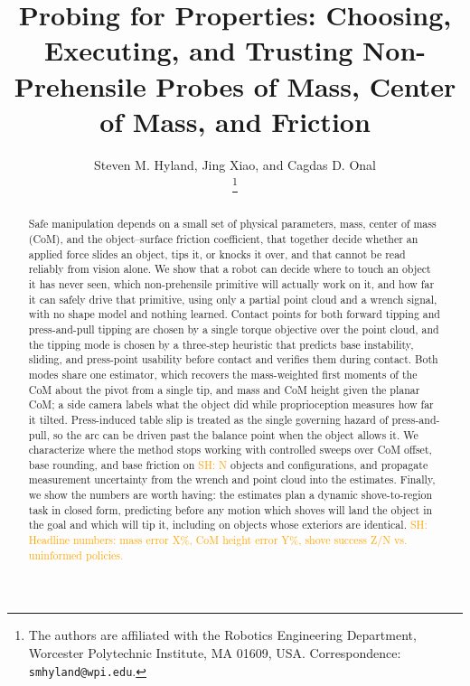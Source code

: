 \documentclass[10pt, conference]{IEEEtran}
\title{\LARGE \bf Probing for Properties: Choosing, Executing, and Trusting Non-Prehensile Probes of Mass, Center of Mass, and Friction}
\newcommand{\sh}[1]{\textcolor{orange}{SH: #1}}
\begin{document}
\author{Steven M. Hyland, Jing Xiao, and Cagdas D. Onal \\ \thanks{The authors are affiliated with the Robotics Engineering Department, Worcester Polytechnic Institute, MA 01609, USA. Correspondence: \texttt{smhyland@wpi.edu}.}}

\maketitle
\pagestyle{plain}
\thispagestyle{plain}

\begin{abstract}
Safe manipulation depends on a small set of physical parameters, mass, center of mass (CoM), and the object--surface friction coefficient, that together decide whether an applied force slides an object, tips it, or knocks it over, and that cannot be read reliably from vision alone. We show that a robot can decide where to touch an object it has never seen, which non-prehensile primitive will actually work on it, and how far it can safely drive that primitive, using only a partial point cloud and a wrench signal, with no shape model and nothing learned. Contact points for both forward tipping and press-and-pull tipping are chosen by a single torque objective over the point cloud, and the tipping mode is chosen by a three-step heuristic that predicts base instability, sliding, and press-point usability before contact and verifies them during contact. Both modes share one estimator, which recovers the mass-weighted first moments of the CoM about the pivot from a single tip, and mass and CoM height given the planar CoM; a side camera labels what the object did while proprioception measures how far it tilted. Press-induced table slip is treated as the single governing hazard of press-and-pull, so the arc can be driven past the balance point when the object allows it. We characterize where the method stops working with controlled sweeps over CoM offset, base rounding, and base friction on \sh{N} objects and configurations, and propagate measurement uncertainty from the wrench and point cloud into the estimates. Finally, we show the numbers are worth having: the estimates plan a dynamic shove-to-region task in closed form, predicting before any motion which shoves will land the object in the goal and which will tip it, including on objects whose exteriors are identical. \sh{Headline numbers: mass error X\%, CoM height error Y\%, shove success Z/N vs. uninformed policies.}
\end{abstract}
\end{document}
